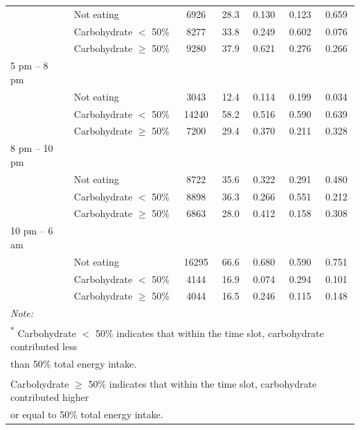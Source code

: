 \begin{table}
\begin{tabular}[t]{llccccc}
		& Not eating & 6926 & 28.3 & 0.130 & 0.123 & 0.659\\
		& Carbohydrate $<$ 50\% & 8277 & 33.8 & 0.249 & 0.602 & 0.076\\
		& Carbohydrate $\geqslant$ 50\% & 9280 & 37.9 & 0.621 & 0.276 & 0.266\\
		5 pm – 8 pm &  &  &  &  &  & \\
		& Not eating & 3043 & 12.4 & 0.114 & 0.199 & 0.034\\
		& Carbohydrate $<$ 50\% & 14240 & 58.2 & 0.516 & 0.590 & 0.639\\
		& Carbohydrate $\geqslant$ 50\% & 7200 & 29.4 & 0.370 & 0.211 & 0.328\\
		8 pm – 10 pm &  &  &  &  &  & \\
		& Not eating & 8722 & 35.6 & 0.322 & 0.291 & 0.480\\
		& Carbohydrate $<$ 50\% & 8898 & 36.3 & 0.266 & 0.551 & 0.212\\
		& Carbohydrate $\geqslant$ 50\% & 6863 & 28.0 & 0.412 & 0.158 & 0.308\\
		10 pm – 6 am &  &  &  &  &  & \\
		& Not eating & 16295 & 66.6 & 0.680 & 0.590 & 0.751\\
		& Carbohydrate $<$ 50\% & 4144 & 16.9 & 0.074 & 0.294 & 0.101\\
		& Carbohydrate $\geqslant$ 50\% & 4044 & 16.5 & 0.246 & 0.115 & 0.148\\
		\bottomrule
		\multicolumn{7}{l}{\textit{Note: }}\\
		\multicolumn{7}{l}{\textsuperscript{*} Carbohydrate $<$ 50\% indicates that within the time slot, carbohydrate contributed less }\\
		\multicolumn{7}{l}{than 50\% total energy intake.}\\ 
		\multicolumn{7}{l}{\textsuperscript{\dag} Carbohydrate $\geqslant$ 50\% indicates that within the time slot, carbohydrate contributed higher }\\
		\multicolumn{7}{l}{or equal to 50\% total energy intake.}\\ 
	\end{tabular}
\end{table}






